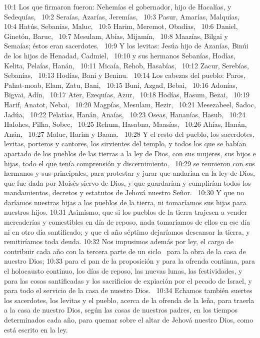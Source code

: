 10:1 Los que firmaron fueron: Nehemías el gobernador, hijo de Hacalías, y Sedequías,  
10:2 Seraías, Azarías, Jeremías,  
10:3 Pasur, Amarías, Malquías,  
10:4 Hatús, Sebanías, Maluc,  
10:5 Harim, Meremot, Obadías,  
10:6 Daniel, Ginetón, Baruc,  
10:7 Mesulam, Abías, Mijamín,  
10:8 Maazías, Bilgai y Semaías; éstos eran sacerdotes.  
10:9 Y los levitas: Jesúa hijo de Azanías, Binúi de los hijos de Henadad, Cadmiel,  
10:10 y sus hermanos Sebanías, Hodías, Kelita, Pelaías, Hanán,  
10:11 Micaía, Rehob, Hasabías,  
10:12 Zacur, Serebías, Sebanías,  
10:13 Hodías, Bani y Beninu.  
10:14 Los cabezas del pueblo: Paros, Pahat-moab, Elam, Zatu, Bani,  
10:15 Buni, Azgad, Bebai,  
10:16 Adonías, Bigvai, Adín,  
10:17 Ater, Ezequías, Azur,  
10:18 Hodías, Hasum, Bezai,  
10:19 Harif, Anatot, Nebai,  
10:20 Magpías, Mesulam, Hezir,  
10:21 Mesezabeel, Sadoc, Jadúa,  
10:22 Pelatías, Hanán, Anaías,  
10:23 Oseas, Hananías, Hasub,  
10:24 Halohes, Pilha, Sobec,  
10:25 Rehum, Hasabna, Maasías,  
10:26 Ahías, Hanán, Anán,  
10:27 Maluc, Harim y Baana.  
10:28 Y el resto del pueblo, los sacerdotes, levitas, porteros y cantores, los sirvientes del templo, y todos los que se habían apartado de los pueblos de las tierras a la ley de Dios, con sus mujeres, sus hijos e hijas, todo el que tenía comprensión y discernimiento,  
10:29 se reunieron con sus hermanos y sus principales, para protestar y jurar que andarían en la ley de Dios, que fue dada por Moisés siervo de Dios, y que guardarían y cumplirían todos los mandamientos, decretos y estatutos de Jehová nuestro Señor.  
10:30 Y que no daríamos nuestras hijas a los pueblos de la tierra, ni tomaríamos sus hijas para nuestros hijos. 
10:31 Asimismo, que si los pueblos de la tierra trajesen a vender mercaderías y comestibles en día de reposo, nada tomaríamos de ellos en ese día ni en otro día santificado; y que el año séptimo dejaríamos descansar la tierra, y remitiríamos toda deuda. 
10:32 Nos impusimos además por ley, el cargo de contribuir cada año con la tercera parte de un siclo  para la obra de la casa de nuestro Dios; 
10:33 para el pan de la proposición y para la ofrenda continua, para el holocausto continuo, los días de reposo, las nuevas lunas, las festividades, y para las cosas santificadas y los sacrificios de expiación por el pecado de Israel, y para todo el servicio de la casa de nuestro Dios.  
10:34 Echamos también suertes los sacerdotes, los levitas y el pueblo, acerca de la ofrenda de la leña, para traerla a la casa de nuestro Dios, según las casas de nuestros padres, en los tiempos determinados cada año, para quemar sobre el altar de Jehová nuestro Dios, como está escrito en la ley.  
